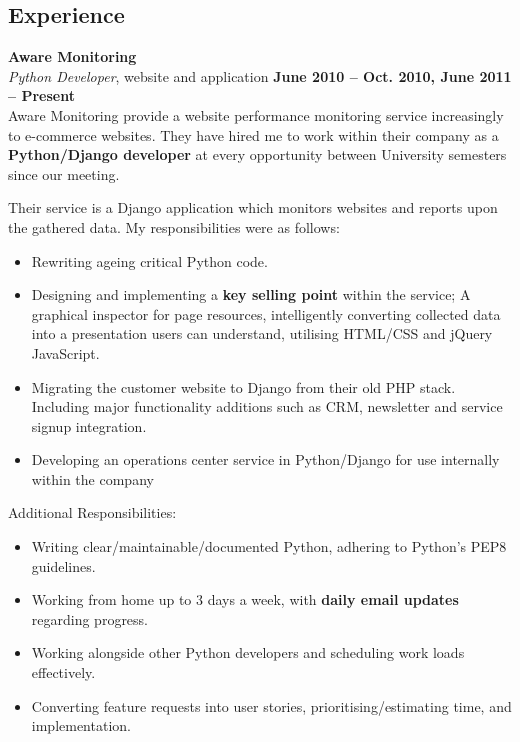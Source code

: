 \documentclass[margin,line]{resume}
\begin{document}
\begin{resume}
    \section{\mysidestyle Experience}

    \textbf{Aware Monitoring} \vspace{2mm}\\\vspace{1mm}%
    \textsl{Python Developer}, website and application \hfill \textbf{June 2010 -- Oct. 2010, June 2011 -- Present}\\
    Aware Monitoring provide a website performance monitoring service increasingly to e-commerce websites. They have hired me to work within their company as a \textbf{Python/Django developer} at every opportunity between University semesters since our meeting.
    
    Their service is a Django application which monitors websites and reports upon the gathered data. My responsibilities were as follows:
    
	\begin{itemize}
		\item Rewriting ageing critical Python code.
		\item Designing and implementing a \textbf{key selling point} within the service; A graphical inspector for page resources, intelligently converting collected data into a presentation users can understand, utilising HTML/CSS and jQuery JavaScript.
		\item Migrating the customer website to Django from their old PHP stack. Including major functionality additions such as CRM, newsletter and service signup integration.
		\item Developing an operations center service in Python/Django for use internally within the company
	\end{itemize}
	
	Additional Responsibilities: 
	\begin{itemize}
		\item Writing clear/maintainable/documented Python, adhering to Python's PEP8 guidelines.
		\item Working from home up to 3 days a week, with \textbf{daily email updates} regarding progress.
		\item Working alongside other Python developers and scheduling work loads effectively.
		\item Converting feature requests into user stories, prioritising/estimating time, and implementation.
	\end{itemize}
	

\end{resume}
\end{document}
